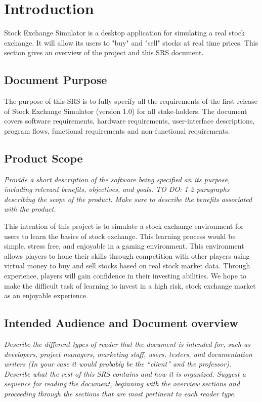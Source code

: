 \documentclass[12 pt, a4paper]{report}
\begin{document}
	
	
	\tableofcontents
	\chapter{Introduction}
	Stock Exchange Simulator is a desktop application for simulating a real stock exchange. It will allow its users to "buy" and "sell" stocks at real time prices. This section gives an overview of the project and this SRS document.
	\section {Document Purpose}
	The purpose of this SRS is to fully specify all the requirements of the first release of Stock Exchange Simulator (version 1.0) for all stake-holders. The document covers software requirements, hardware requirements, user-interface descriptions, program flows, functional requirements and non-functional requirements.
	
	\section{Product Scope}
	\textit{Provide a short description of the software being specified an its purpose, including relevant benefits, objectives, and goals. TO DO: 1-2 paragraphs describing the scope of the product. Make sure to describe the benefits associated with the product.}
		
	This intention of this project is to simulate a stock exchange environment for  users to learn the basics of stock exchange. This learning process would be simple, stress free, and enjoyable in a gaming environment. This environment allows players to hone their skills through competition with other players using virtual money to  buy and sell stocks based on real stock market data. Through experience, players will gain confidence in their investing abilities. We hope to make the difficult task of learning to invest in a high risk, stock exchange market as an enjoyable experience.
	
	\section{Intended Audience and Document overview}
	\textit{Describe the different types of reader that the document is intended for, such as developers, project managers, marketing staff, users, testers, and documentation writers (In your case it would probably be the “client” and the professor). Describe what the rest of this SRS contains and how it is organized. Suggest a sequence for reading the document, beginning with the overview sections and proceeding through the sections that are most pertinent to each reader type.}
	
\end{document}
